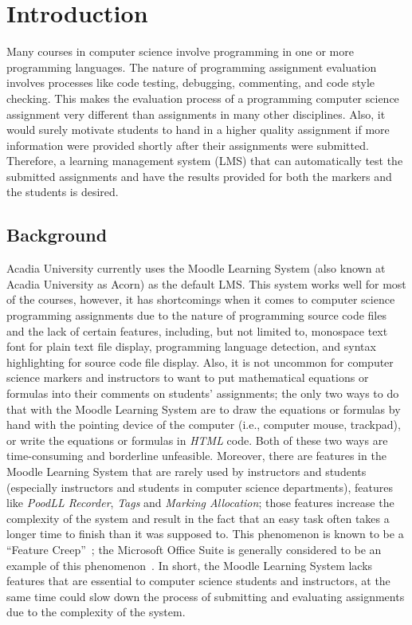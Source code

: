 

\chapter{Introduction}
\label{chap:INTRO}

Many courses in computer science involve programming in one or more programming
languages.
The nature of programming assignment evaluation
involves processes like code testing, debugging, commenting, and code style
checking.
This makes the evaluation process of a programming computer science assignment
very different than assignments in many other disciplines.
Also, it would surely motivate students to hand in a higher quality assignment
if more information were provided shortly after their assignments were
submitted.
Therefore, a learning management system (LMS) that can automatically test the
submitted assignments and have the results provided for both the markers and
the students is desired.

\section{Background}

Acadia University currently uses the Moodle Learning System (also known at 
Acadia University as Acorn) as the default LMS.
This system works well for most of the courses, however, it has shortcomings
when it comes to computer science programming assignments due to
the nature of programming source code files and the lack of certain
features, including, but not limited to, monospace text font for plain text
file display, programming language detection, and syntax
highlighting for source code file display.
Also, it is not uncommon for computer science markers and instructors
to want to put mathematical equations or formulas into their comments on
students' assignments; the only two ways to do that with the Moodle
Learning System are to draw the equations or formulas by hand with the
pointing device of the computer (i.e., computer mouse, trackpad), or write
the equations or formulas in \emph{HTML} code. Both of these two ways are
time-consuming and borderline unfeasible.
Moreover, there are features in the Moodle Learning System that are rarely
used by instructors and students (especially instructors and students in
computer science departments), features like \emph{PoodLL Recorder},
\emph{Tags} and \emph{Marking Allocation};
those features increase the
complexity of the system and result in the fact that an easy task 
often takes a longer time to finish than it was supposed to. This phenomenon
is known to be a ``Feature Creep''~\cite{featureCreep};
the Microsoft Office Suite is generally
considered to be an example of this phenomenon~\cite{msFeatureCreep}.
In short, the Moodle Learning System lacks features that are essential
to computer science students and instructors, at the same time could slow
down the process of submitting and evaluating assignments due to the complexity
of the system.

